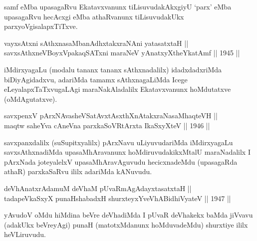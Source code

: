 \begin{artha}
samf eMba upasagaRvu Ekatavxvanunx tiLisuvudakAkxgiyU `parx' eMba
upasagaRvu hecAcxgi eMba athaRvanunx tiLisuvudakUkx
parxyoVgisalapxTiTxve.
\end{artha}


\begin{shl}
vayxsAtxni sAthxnasaMbanAdhxtakxraNAni yatasatxtaH || \\
savxsAthxneVBoyxV\s pakaqSATxni maraNeV yAnatxyXtheYkatAmf ||  1945 ||  
\end{shl}

\begin{artha}
iMdirxyagaLu (modalu tananx tananx sAthxnadalilx) idadxdadxriMda
biDiyAgidadxvu, adariMda tamamx sAthxnagaLiMda Icege
eLeyalapxTaTxvugaLAgi maraNakAladalilx Ekatavxvanunx hoMdutatxve
(oMdAgutatxve).
\end{artha}


\begin{shl}
savxpenxV pArxNAvasheVSatAvxtAsxthXnAtakxraNasaMhaqteVH || \\
maqtw saheYva cAneVna parxkaSoVR\s tArxta IkaSxyXteV ||  1946 ||  
\end{shl}

\begin{artha}
savxpanxdalilx (suSupitxyalilx) pArxNavu uLiyuvudariMda iMdirxyagaLu
savxsAthxnadiMda upasaMhAravanunx hoMdiruvudakikxMtalU maraNadalilx I
pArxNada joteyalelxV upasaMhAravAguvudu hecicxnadeMdu (upasagaRda
athaR) parxkaSaRvu ililx adariMda kANuvudu.
\end{artha}


\begin{shl}
deVhAnatxrAdamuM deVhaM pUvaRmAgAdayxtasatxtaH || \\
tadapeVkaSxyX punaHshabadxH shurxteyxYveVhABidhiVyateV ||  1947 ||  
\end{shl}

\begin{artha}
yAvudoV oMdu hiMdina beVre deVhadiMda I pUvaR deVhakekx baMda jiVvavu (adakUkx beVreyAgi) punaH (matotxMdanunx hoMduvadeMdu) shurxtiye ililx heVLiruvudu.
\end{artha}


